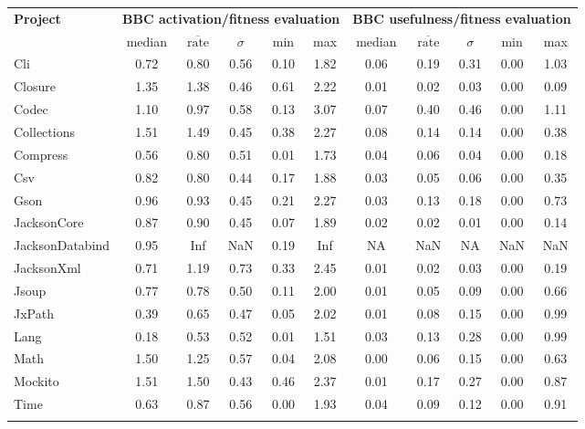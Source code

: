 \begin{tabular}{ l | ccccc | ccccc }
\hline 
\textbf{Project} & \multicolumn{5}{c|}{\textbf{BBC activation/fitness evaluation}} & \multicolumn{5}{c}{\textbf{BBC usefulness/fitness evaluation }} \\ 
  & median & $\overline{\text{rate}}$ & $\sigma$ & min & max & median & $\overline{\text{rate}}$ & $\sigma$ & min & max \\ 
\hline 
Cli & 0.72 & 0.80 & 0.56 & 0.10 & 1.82 & 0.06 & 0.19 & 0.31 & 0.00 & 1.03 \\ 
Closure & 1.35 & 1.38 & 0.46 & 0.61 & 2.22 & 0.01 & 0.02 & 0.03 & 0.00 & 0.09 \\ 
Codec & 1.10 & 0.97 & 0.58 & 0.13 & 3.07 & 0.07 & 0.40 & 0.46 & 0.00 & 1.11 \\ 
Collections & 1.51 & 1.49 & 0.45 & 0.38 & 2.27 & 0.08 & 0.14 & 0.14 & 0.00 & 0.38 \\ 
Compress & 0.56 & 0.80 & 0.51 & 0.01 & 1.73 & 0.04 & 0.06 & 0.04 & 0.00 & 0.18 \\ 
Csv & 0.82 & 0.80 & 0.44 & 0.17 & 1.88 & 0.03 & 0.05 & 0.06 & 0.00 & 0.35 \\ 
Gson & 0.96 & 0.93 & 0.45 & 0.21 & 2.27 & 0.03 & 0.13 & 0.18 & 0.00 & 0.73 \\ 
JacksonCore & 0.87 & 0.90 & 0.45 & 0.07 & 1.89 & 0.02 & 0.02 & 0.01 & 0.00 & 0.14 \\ 
JacksonDatabind & 0.95 & Inf & NaN & 0.19 & Inf &  NA & NaN &  NA & NaN & NaN \\ 
JacksonXml & 0.71 & 1.19 & 0.73 & 0.33 & 2.45 & 0.01 & 0.02 & 0.03 & 0.00 & 0.19 \\ 
Jsoup & 0.77 & 0.78 & 0.50 & 0.11 & 2.00 & 0.01 & 0.05 & 0.09 & 0.00 & 0.66 \\ 
JxPath & 0.39 & 0.65 & 0.47 & 0.05 & 2.02 & 0.01 & 0.08 & 0.15 & 0.00 & 0.99 \\ 
Lang & 0.18 & 0.53 & 0.52 & 0.01 & 1.51 & 0.03 & 0.13 & 0.28 & 0.00 & 0.99 \\ 
Math & 1.50 & 1.25 & 0.57 & 0.04 & 2.08 & 0.00 & 0.06 & 0.15 & 0.00 & 0.63 \\ 
Mockito & 1.51 & 1.50 & 0.43 & 0.46 & 2.37 & 0.01 & 0.17 & 0.27 & 0.00 & 0.87 \\ 
Time & 0.63 & 0.87 & 0.56 & 0.00 & 1.93 & 0.04 & 0.09 & 0.12 & 0.00 & 0.91 \\ 
 \\ 
\end{tabular}
